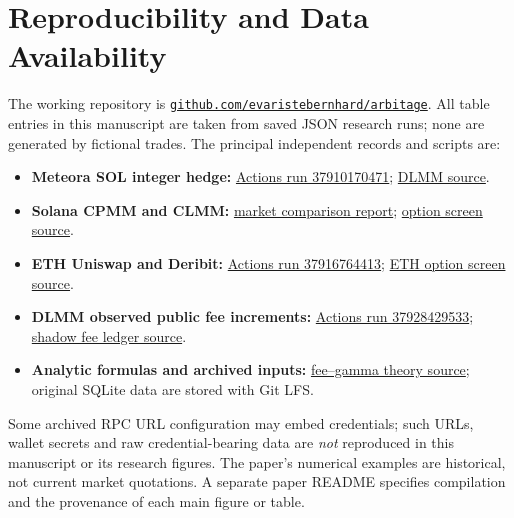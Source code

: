 \section*{Reproducibility and Data Availability}
The working repository is
\href{https://github.com/evaristebernhard/arbitage}{\texttt{github.com/evaristebernhard/arbitage}}. All table entries in this manuscript are taken from saved JSON research runs; none are generated by fictional trades. The principal independent records and scripts are:
\begin{itemize}[leftmargin=*,itemsep=1pt,topsep=1pt]
\item \textbf{Meteora SOL integer hedge:}
\href{https://github.com/evaristebernhard/arbitage/actions/runs/37910170471}{Actions run 37910170471};
\href{https://github.com/evaristebernhard/arbitage/blob/main/research/dlmm_option_window_strategy.py}{DLMM source}.
\item \textbf{Solana CPMM and CLMM:}
\href{https://github.com/evaristebernhard/arbitage/blob/main/docs/sol-cross-protocol-option-screen-20261009.md}{market comparison report};
\href{https://github.com/evaristebernhard/arbitage/blob/main/research/sol_cross_protocol_option_screen.py}{option screen source}.
\item \textbf{ETH Uniswap and Deribit:}
\href{https://github.com/evaristebernhard/arbitage/actions/runs/37916764413}{Actions run 37916764413};
\href{https://github.com/evaristebernhard/arbitage/blob/main/research/eth_uniswap_option_screen.py}{ETH option screen source}.
\item \textbf{DLMM observed public fee increments:}
\href{https://github.com/evaristebernhard/arbitage/actions/runs/37928429533}{Actions run 37928429533};
\href{https://github.com/evaristebernhard/arbitage/blob/main/research/dlmm_fixed_bin_cohort.py}{shadow fee ledger source}.
\item \textbf{Analytic formulas and archived inputs:}
\href{https://github.com/evaristebernhard/arbitage/blob/main/research/fee_gamma_lvr_theory.py}{fee--gamma theory source};
original SQLite data are stored with Git LFS.
\end{itemize}
Some archived RPC URL configuration may embed credentials; such URLs, wallet secrets and raw credential-bearing data are \emph{not} reproduced in this manuscript or its research figures. The paper's numerical examples are historical, not current market quotations. A separate paper README specifies compilation and the provenance of each main figure or table.

